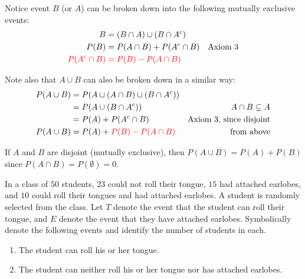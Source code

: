 \begin{example}
    Notice event $B$ (or $A$) can be broken down into the following mutually exclusive events: 
    $$\begin{aligned}[t] B & = (B \cap A) \cup (B \cap A^c) \\ P(B) & = P(A \cap B) + P(A^c \cap B) & \text{Axiom 3} \\ \color{red} P(A^c \cap B) & \color{red} = P(B) - P(A \cap B) \end{aligned}$$

    Note also that $A \cup B$ can also be broken down in a similar way: 
    $$\begin{aligned}[t] P(A \cup B) & = P(A \cup (A \cap B) \cup (B \cap A^c)) \\ & = P(A \cup (B \cap A^c)) & A \cap B \subseteq A \\ & = P(A) + P(A^c \cap B) & \text{Axiom 3, since disjoint} \\ P(A \cup B) & = P(A) + \color{red} P(B) - P(A \cap B) & \text{from above} \end{aligned}$$

    If $A$ and $B$ are disjoint (mutually exclusive), then $P(A \cup B) = P(A) + P(B)$ since $P(A \cap B) = P(\emptyset) = 0$. 
\end{example}

\begin{example}
    In a class of $50$ students, $23$ could not roll their tongue, $15$ had attached earlobes, and $10$ could roll their tongues and had attached earlobes. A student is randomly selected from the class. Let $T$ denote the event that the student can roll their tongue, and $E$ denote the event that they have attached earlobes. Symbolically denote the following events and identify the number of students in each.

    \begin{enumerate}[label=\alph*)]
        \item The student can roll his or her tongue.
        \item  The student can neither roll his or her tongue nor has attached earlobes.
    \end{enumerate}
\end{example}